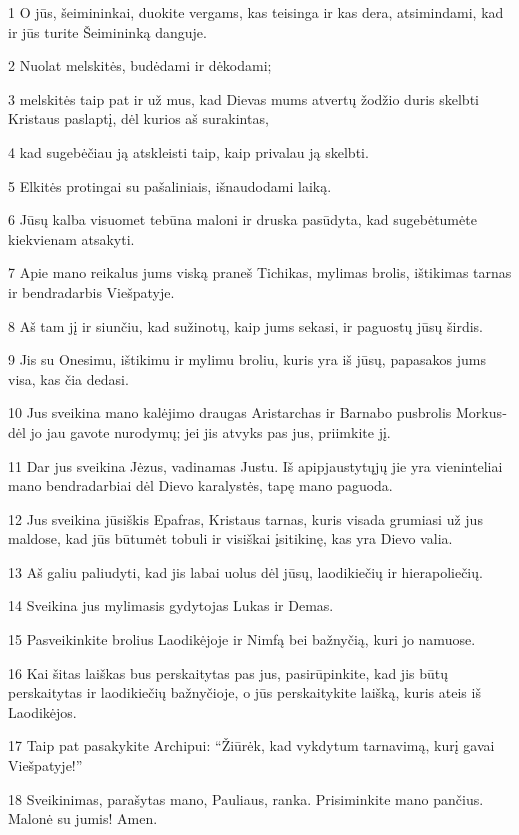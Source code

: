 \par 1 O jūs, šeimininkai, duokite vergams, kas teisinga ir kas dera, atsimindami, kad ir jūs turite Šeimininką danguje. 
\par 2 Nuolat melskitės, budėdami ir dėkodami; 
\par 3 melskitės taip pat ir už mus, kad Dievas mums atvertų žodžio duris skelbti Kristaus paslaptį, dėl kurios aš surakintas, 
\par 4 kad sugebėčiau ją atskleisti taip, kaip privalau ją skelbti. 
\par 5 Elkitės protingai su pašaliniais, išnaudodami laiką. 
\par 6 Jūsų kalba visuomet tebūna maloni ir druska pasūdyta, kad sugebėtumėte kiekvienam atsakyti. 
\par 7 Apie mano reikalus jums viską praneš Tichikas, mylimas brolis, ištikimas tarnas ir bendradarbis Viešpatyje. 
\par 8 Aš tam jį ir siunčiu, kad sužinotų, kaip jums sekasi, ir paguostų jūsų širdis. 
\par 9 Jis su Onesimu, ištikimu ir mylimu broliu, kuris yra iš jūsų, papasakos jums visa, kas čia dedasi. 
\par 10 Jus sveikina mano kalėjimo draugas Aristarchas ir Barnabo pusbrolis Morkus­dėl jo jau gavote nurodymų; jei jis atvyks pas jus, priimkite jį. 
\par 11 Dar jus sveikina Jėzus, vadinamas Justu. Iš apipjaustytųjų jie yra vieninteliai mano bendradarbiai dėl Dievo karalystės, tapę mano paguoda. 
\par 12 Jus sveikina jūsiškis Epafras, Kristaus tarnas, kuris visada grumiasi už jus maldose, kad jūs būtumėt tobuli ir visiškai įsitikinę, kas yra Dievo valia. 
\par 13 Aš galiu paliudyti, kad jis labai uolus dėl jūsų, laodikiečių ir hierapoliečių. 
\par 14 Sveikina jus mylimasis gydytojas Lukas ir Demas. 
\par 15 Pasveikinkite brolius Laodikėjoje ir Nimfą bei bažnyčią, kuri jo namuose. 
\par 16 Kai šitas laiškas bus perskaitytas pas jus, pasirūpinkite, kad jis būtų perskaitytas ir laodikiečių bažnyčioje, o jūs perskaitykite laišką, kuris ateis iš Laodikėjos. 
\par 17 Taip pat pasakykite Archipui: “Žiūrėk, kad vykdytum tarnavimą, kurį gavai Viešpatyje!” 
\par 18 Sveikinimas, parašytas mano, Pauliaus, ranka. Prisiminkite mano pančius. Malonė su jumis! Amen.


